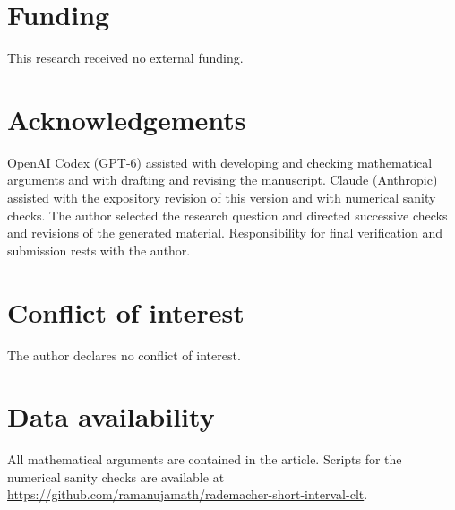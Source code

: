 \documentclass[11pt]{amsart}
\theoremstyle{remark}
\numberwithin{equation}{section}
\begin{document}
\section*{Funding}
This research received no external funding.

\section*{Acknowledgements}
OpenAI Codex (GPT-6) assisted with developing and checking mathematical arguments and with drafting and revising the manuscript. Claude (Anthropic) assisted with the expository revision of this version and with numerical sanity checks. The author selected the research question and directed successive checks and revisions of the generated material. Responsibility for final verification and submission rests with the author.

\section*{Conflict of interest}
The author declares no conflict of interest.

\section*{Data availability}
All mathematical arguments are contained in the article. Scripts for the numerical sanity checks are available at \url{https://github.com/ramanujamath/rademacher-short-interval-clt}.
\end{document}
